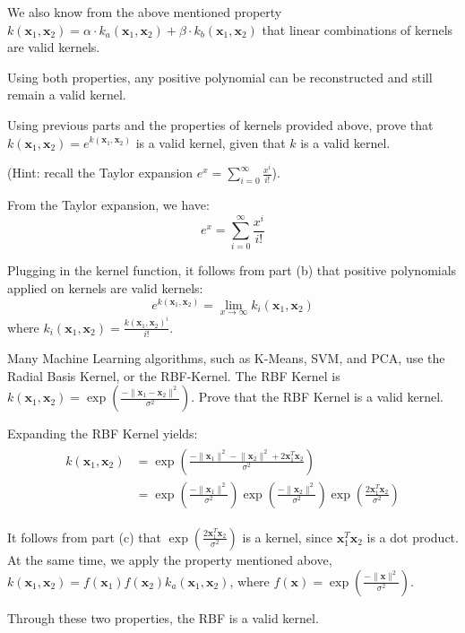 \begin{Parts}
\begin{solution}
We also know from the above mentioned property $ k(\textbf{x}_1, \textbf{x}_2) = \alpha \cdot k_a(\textbf{x}_1, \textbf{x}_2) + \beta \cdot k_b(\textbf{x}_1, \textbf{x}_2) $ that linear combinations of kernels are valid kernels.

Using both properties, any positive polynomial can be reconstructed and still remain a valid kernel.

\end{solution}

\Part Using previous parts and the properties of kernels provided above, prove that $ k(\textbf{x}_1, \textbf{x}_2) = e^{k(\textbf{x}_1, \textbf{x}_2)} $ is a valid kernel, given that $ k $ is a valid kernel.

(Hint: recall the Taylor expansion $ e^ x = \sum_{i=0}^{\infty}\frac{x^i}{i!}$).

\begin{solution}

From the Taylor expansion, we have:
$$ e^ x = \sum_{i=0}^{\infty}\frac{x^i}{i!}$$

Plugging in the kernel function, it follows from part (b) that positive polynomials applied on kernels are valid kernels:
$$ e^{k(\textbf{x}_1, \textbf{x}_2)} = \lim_{x\to\infty}k_i(\textbf{x}_1, \textbf{x}_2) $$ where $ k_i(\textbf{x}_1, \textbf{x}_2) = \frac{k(\textbf{x}_1, \textbf{x}_2)^i}{i!} $. 

\end{solution}

\Part Many Machine Learning algorithms, such as K-Means, SVM, and PCA, use the Radial Basis Kernel, or the RBF-Kernel. The RBF Kernel is $ k(\textbf{x}_1, \textbf{x}_2) = \exp(\frac{-\lVert \textbf{x}_1 - \textbf{x}_2 \rVert^{2}}{\sigma^{2}}) $. Prove that the RBF Kernel is a valid kernel.

\begin{solution}

Expanding the RBF Kernel yields:
\begin{align*}\begin{split}
 k(\textbf{x}_1, \textbf{x}_2) & = \exp(\frac{-\lVert \textbf{x}_1\rVert^{2}-\lVert \textbf{x}_2\rVert^{2}+2\textbf{x}_1^{T}\textbf{x}_2}{\sigma^{2}}) \\
 & = \exp(\frac{-\lVert \textbf{x}_1\rVert^{2}}{\sigma^{2}})\exp(\frac{-\lVert \textbf{x}_2\rVert^{2}}{\sigma^{2}})\exp(\frac{2\textbf{x}_1^{T}\textbf{x}_2}{\sigma^{2}}) 
\end{split}\end{align*}

It follows from part (c) that $ \exp(\frac{2\textbf{x}_1^{T}\textbf{x}_2}{\sigma^{2}}) $ is a kernel, since $ \textbf{x}_1^{T}\textbf{x}_2 $ is a dot product. 
At the same time, we apply the property mentioned above, $ k(\textbf{x}_1, \textbf{x}_2) = f(\textbf{x}_1)f(\textbf{x}_2)k_a(\textbf{x}_1, \textbf{x}_2) $, where $ f(\textbf{x})=  \exp(\frac{-\lVert \textbf{x}\rVert^{2}}{\sigma^{2}}) $.

Through these two properties, the RBF is a valid kernel.

\end{solution}


\end{Parts}

\newpage